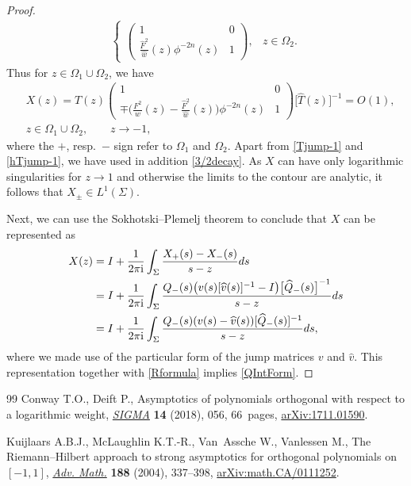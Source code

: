 \documentclass[10pt,a4paper]{amsart}
\newcommand{\Id}{I}
\newcommand{\hw}{\widehat w}
\newcommand{\hQ}{{\widehat Q}}
\newcommand{\bv}{v}
\newcommand{\hv}{{\widehat v}}
\newcommand{\hF}{\widehat F}
\newcommand{\I}{\mathrm{i}}
\numberwithin{equation}{section}
\begin{document}
\begin{proof}
\begin{align*}
\begin{cases}
\begin{pmatrix}
1 & 0
\\
\frac{\hF^2}{\hw}(z) \phi^{-2n}(z) & 1
\end{pmatrix},& z \in \Omega_2.
\end{cases}
\end{align*}
Thus for $z\in \Omega_1\cup \Omega_2$, we have
\begin{align*}
 &X(z) = T(z)
 \begin{pmatrix}
 1 & 0
 \\
 \mp\big(\frac{F^2}{w}(z)-\frac{\hF^2}{\hw}(z)\big) \phi^{-2n}(z) & 1
 \end{pmatrix}
 \big[\widehat T(z)\big]^{-1} = O(1),
 \\
 &z\in \Omega_1\cup\Omega_2, \qquad z\to-1,
\end{align*}
where the $+$, resp.\ $-$ sign refer to $\Omega_1$ and $\Omega_2$. Apart from \eqref{Tjump-1} and \eqref{hTjump-1}, we have used in addition \eqref{3/2decay}. As $X$ can have only logarithmic singularities for $z \to 1$ and otherwise the limits to the contour are analytic, it follows that $X_\pm \in L^1(\Sigma)$.

Next, we can use the Sokhotski--Plemelj theorem to conclude that $X$ can be represented as
\begin{align*}
 X(z) &= \Id + \frac{1}{2\pi \I}\int_\Sigma \frac{X_+(s)-X_-(s)}{s-z} {\rm d}s
 \\
 &= \Id + \frac{1}{2\pi \I}\int_\Sigma \frac{Q_-(s)\big(\bv(s)[\hv(s)]^{-1}-\Id\big)\big[\hQ_-(s)\big]^{-1}}{s-z} {\rm d}s
 \\
 &= \Id + \frac{1}{2\pi \I}\int_\Sigma \frac{Q_-(s)(\bv(s)-\hv(s))[\hQ_-(s)]^{-1}}{s-z} {\rm d}s,
\end{align*}
where we made use of the particular form of the jump matrices $\bv$ and $\hv$. This representation together with \eqref{Rformula} implies \eqref{QIntForm}.
\end{proof}

\begin{thebibliography}{99}
Conway T.O., Deift P., Asymptotics of polynomials orthogonal with respect to a
 logarithmic weight, \href{https://doi.org/10.3842/SIGMA.2018.056}{\textit{SIGMA}} \textbf{14} (2018), 056, 66~pages,
 \href{https://arxiv.org/abs/1711.01590}{arXiv:1711.01590}.


Kuijlaars A.B.J., McLaughlin K.T.-R., Van~Assche W., Vanlessen M., The
 {R}iemann--{H}ilbert approach to strong asymptotics for orthogonal
 polynomials on {$[-1,1]$}, \href{https://doi.org/10.1016/j.aim.2003.08.015}{\textit{Adv. Math.}} \textbf{188} (2004), 337--398,
 \href{https://arxiv.org/abs/math.CA/0111252}{arXiv:math.CA/0111252}.
\end{thebibliography}
\end{document}
